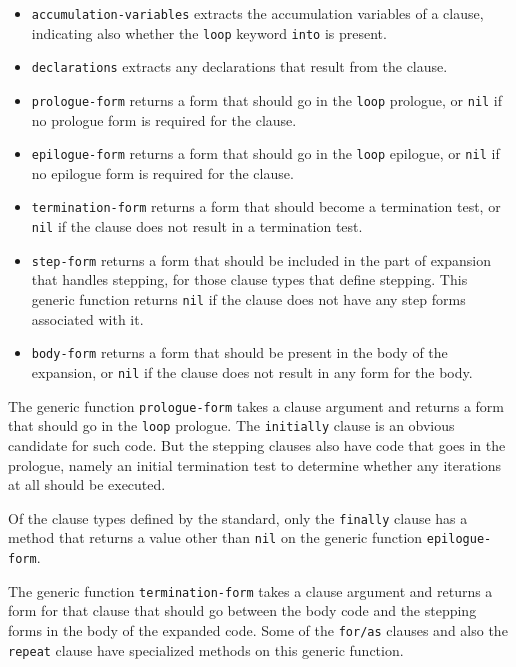 \begin{itemize}
\item \texttt{accumulation-variables} extracts the accumulation
  variables of a clause, indicating also whether the \texttt{loop}
  keyword \texttt{into} is present.
\item \texttt{declarations} extracts any declarations that result from
  the clause.
\item \texttt{prologue-form} returns a form that should go in the
  \texttt{loop} prologue, or \texttt{nil} if no prologue form is
  required for the clause.
\item \texttt{epilogue-form} returns a form that should go in the
  \texttt{loop} epilogue, or \texttt{nil} if no epilogue form is
  required for the clause.
\item \texttt{termination-form} returns a form that should become a
  termination test, or \texttt{nil} if the clause does not result in a
  termination test.
\item \texttt{step-form} returns a form that should be included in the
  part of expansion that handles stepping, for those clause types that
  define stepping.  This generic function returns \texttt{nil} if the
  clause does not have any step forms associated with it.
\item \texttt{body-form} returns a form that should be present in the
  body of the expansion, or \texttt{nil} if the clause does not result
  in any form for the body.
\end{itemize}

The generic function \texttt{prologue-form} takes a clause argument
and returns a form that should go in the \texttt{loop} prologue.  The
\texttt{initially} clause is an obvious candidate for such code.  But
the stepping clauses also have code that goes in the prologue, namely
an initial termination test to determine whether any iterations at all
should be executed.

Of the clause types defined by the \commonlisp{} standard, only the
\texttt{finally} clause has a method that returns a value other than
\texttt{nil} on the generic function \texttt{epilogue-form}.

The generic function \texttt{termination-form} takes a clause argument
and returns a form for that clause that should go between the body
code and the stepping forms in the body of the expanded code.  Some of
the \texttt{for/as} clauses and also the \texttt{repeat} clause have
specialized methods on this generic function.

